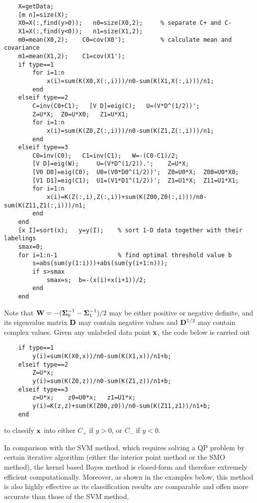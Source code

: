\documentclass{article}
\begin{document}
\begin{verbatim}
    X=getData;
    [m n]=size(X);             
    X0=X(:,find(y>0));   n0=size(X0,2);     % separate C+ and C-
    X1=X(:,find(y<0));   n1=size(X1,2);   
    m0=mean(X0,2);    C0=cov(X0');          % calculate mean and covariance
    m1=mean(X1,2);    C1=cov(X1');    
    if type==1
        for i=1:n
            x(i)=sum(K(X0,X(:,i)))/n0-sum(K(X1,X(:,i)))/n1;
        end
    elseif type==2
        C=inv(C0+C1);   [V D]=eig(C);   U=(V*D^(1/2))';
        Z=U*X;  Z0=U*X0;   Z1=U*X1;
        for i=1:n
            x(i)=sum(K(Z0,Z(:,i)))/n0-sum(K(Z1,Z(:,i)))/n1;
        end
    elseif type==3
        C0=inv(C0);   C1=inv(C1);   W=-(C0-C1)/2;     
        [V D]=eig(W);     U=(V*D^(1/2)).';    Z=U*X;  
        [V0 D0]=eig(C0);  U0=(V0*D0^(1/2))';  Z0=U0*X;  Z00=U0*X0;
        [V1 D1]=eig(C1);  U1=(V1*D1^(1/2))';  Z1=U1*X;  Z11=U1*X1;
        for i=1:n
            x(i)=K(Z(:,i),Z(:,i))+sum(K(Z00,Z0(:,i)))/n0-sum(K(Z11,Z1(:,i)))/n1;
        end
    end
    [x I]=sort(x);   y=y(I);    % sort 1-D data together with their labelings
    smax=0;
    for i=1:n-1                 % find optimal threshold value b
        s=abs(sum(y(1:i)))+abs(sum(y(i+1:n)));
        if s>smax
            smax=s;  b=-(x(i)+x(i+1))/2;
        end
    end
\end{verbatim}

Note that ${\bf W}=-({\bf\Sigma}_0^{-1}-{\bf\Sigma}_1^{-1})/2$ may be 
either positive or negative definite, and its eigenvalue matrix ${\bf D}$
may contain negative values and ${\bf D}^{1/2}$ may contain complex values. 
Given any unlabeled data point ${\bf x}$, the code below is carried out
\begin{verbatim}
    if type==1
        y(i)=sum(K(X0,x))/n0-sum(K(X1,x))/n1+b;
    elseif type==2
        Z=U*x;
        y(i)=sum(K(Z0,z))/n0-sum(K(Z1,z))/n1+b;
    elseif type==3
        z=U*x;    z0=U0*x;   z1=U1*x;
        y(i)=K(z,z)+sum(K(Z00,z0))/n0-sum(K(Z11,z1))/n1+b;
    end
\end{verbatim}
to classify ${\bf x}$ into either $C_+$ if $y>0$, or $C_-$ if $y<0$.

In comparison with the SVM method, which requires solving a QP problem 
by certain iterative algorithm (either the interior point method or the
SMO method), the kernel based Bayes method is closed-form and therefore 
extremely efficient computationally. Moreover, as shown in the examples 
below, this method is also highly effective as its classification results 
are comparable and offen more accurate than those of the SVM method. 
\end{document}
